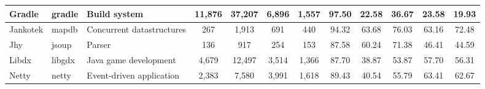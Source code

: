 \begin{landscape}
\begin{table}
\begin{tabular}{lllccccccccc}
Gradle                      & gradle                                                        & Build system                                                             & 11,876          & 37,207           & 6,896                                                            & 1,557          & 97.50          & 22.58          & 36.67          & 23.58                                                             & 19.93                                                              \\ \hline
Jankotek                    & mapdb                                                         & Concurrent datastructures                                                & 267             & 1,913            & 691                                                              & 440            & 94.32          & 63.68          & 76.03          & 63.16                                                             & 72.48                                                              \\ \hline
Jhy                         & jsoup                                                         & Parser                                                                   & 136             & 917              & 254                                                              & 153            & 87.58          & 60.24          & 71.38          & 46.41                                                             & 44.59                                                              \\ \hline
Libdx                       & libgdx                                                        & Java game development                                                    & 4,679           & 12,497           & 3,514                                                            & 1,366          & 87.70          & 38.87          & 53.87          & 57.70                                                             & 56.31                                                              \\ \hline
Netty                       & netty                                                         & Event-driven application                                                 & 2,383           & 7,580            & 3,991                                                            & 1,618          & 89.43          & 40.54          & 55.79          & 63.41                                                             & 62.67                                                              \\ \hline

\end{tabular}
\end{table}
\end{landscape}
